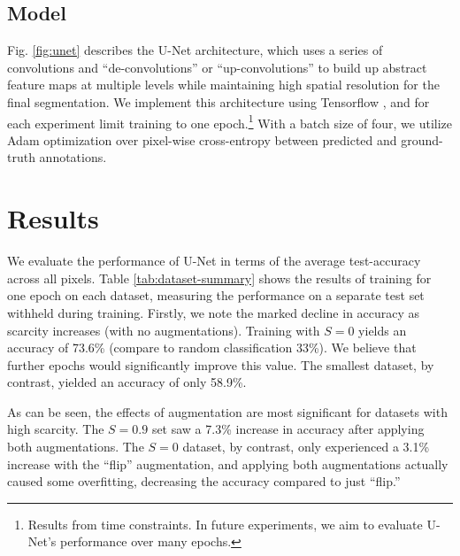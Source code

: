\documentclass[10pt, journal]{IEEEtran}
\begin{document}
\subsection{Model}
\label{sec:model}

Fig. \ref{fig:unet} describes the U-Net architecture, which uses a series of
convolutions and ``de-convolutions'' or ``up-convolutions'' to build up abstract
feature maps at multiple levels while maintaining high spatial resolution for
the final segmentation. We implement this architecture using Tensorflow
\cite{abadi_tensorflow:_nodate}, and for each experiment limit training to one
epoch.\footnote{Results from time constraints. In future experiments, we aim to
  evaluate U-Net's performance over many epochs.} With a batch size of four, we
utilize Adam optimization \cite{kingma_adam:_2014} over pixel-wise cross-entropy
between predicted and ground-truth annotations.

\section{Results}
\label{sec:results}

We evaluate the performance of U-Net in terms of the average test-accuracy
across all pixels. Table \ref{tab:dataset-summary} shows the results of training
for one epoch on each dataset, measuring the performance on a separate test set
withheld during training. Firstly, we note the marked decline in accuracy as
scarcity increases (with no augmentations). Training with $S = 0$ yields an
accuracy of 73.6\% (compare to random classification 33\%). We believe that
further epochs would significantly improve this value. The smallest dataset, by
contrast, yielded an accuracy of only 58.9\%.

As can be seen, the effects of augmentation are most significant for datasets
with high scarcity. The $S = 0.9$ set saw a 7.3\% increase in accuracy after
applying both augmentations. The $S = 0$ dataset, by contrast, only experienced
a 3.1\% increase with the ``flip'' augmentation, and applying both augmentations
actually caused some overfitting, decreasing the accuracy compared to just
``flip.''
\end{document}

